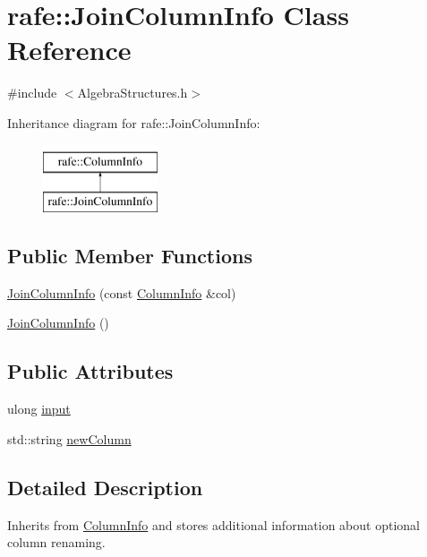 \hypertarget{classrafe_1_1_join_column_info}{\section{rafe\+:\+:Join\+Column\+Info Class Reference}
\label{classrafe_1_1_join_column_info}
}


{\ttfamily \#include $<$Algebra\+Structures.\+h$>$}

Inheritance diagram for rafe\+:\+:Join\+Column\+Info\+:\begin{figure}[H]
\begin{center}
\leavevmode
\includegraphics[height=2.000000cm]{classrafe_1_1_join_column_info}
\end{center}
\end{figure}
\subsection*{Public Member Functions}
\begin{DoxyCompactItemize}
\item 
\hyperlink{classrafe_1_1_join_column_info_ad9a1047f8f126fdbd6ad0530b852a8cf}{Join\+Column\+Info} (const \hyperlink{classrafe_1_1_column_info}{Column\+Info} \&col)
\item 
\hyperlink{classrafe_1_1_join_column_info_a2e4d6cec5ecfb6dfde9a91d3a9d05660}{Join\+Column\+Info} ()
\end{DoxyCompactItemize}
\subsection*{Public Attributes}
\begin{DoxyCompactItemize}
\item 
ulong \hyperlink{classrafe_1_1_join_column_info_af141ca99e62ec1ac85227b9da443a5f4}{input}
\item 
std\+::string \hyperlink{classrafe_1_1_join_column_info_af79ae87d9170139440abfac3fd89e199}{new\+Column}
\end{DoxyCompactItemize}


\subsection{Detailed Description}
Inherits from \hyperlink{classrafe_1_1_column_info}{Column\+Info} and stores additional information about optional column renaming. 

